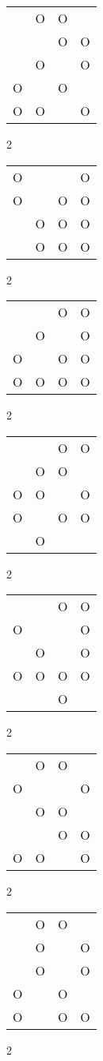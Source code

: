 \begin{tabular}{|m{0.2cm}m{0.2cm}m{0.2cm}m{0.2cm}|}\hline
 &O&O& \\
 & &O&O\\
 &O& &O\\
O& &O& \\
O&O& &O\\
\hline\end{tabular}2
\begin{tabular}{|m{0.2cm}m{0.2cm}m{0.2cm}m{0.2cm}|}\hline
O& & &O\\
O& &O&O\\
 &O&O&O\\
 &O&O&O\\
\hline\end{tabular}2
\begin{tabular}{|m{0.2cm}m{0.2cm}m{0.2cm}m{0.2cm}|}\hline
 & &O&O\\
 &O& &O\\
O& &O&O\\
O&O&O&O\\
\hline\end{tabular}2
\begin{tabular}{|m{0.2cm}m{0.2cm}m{0.2cm}m{0.2cm}|}\hline
 & &O&O\\
 &O&O& \\
O&O& &O\\
O& &O&O\\
 &O& & \\
\hline\end{tabular}2
\begin{tabular}{|m{0.2cm}m{0.2cm}m{0.2cm}m{0.2cm}|}\hline
 & &O&O\\
O& & &O\\
 &O& &O\\
O&O&O&O\\
 & &O& \\
\hline\end{tabular}2
\begin{tabular}{|m{0.2cm}m{0.2cm}m{0.2cm}m{0.2cm}|}\hline
 &O&O& \\
O& & &O\\
 &O&O& \\
 & &O&O\\
O&O& &O\\
\hline\end{tabular}2
\begin{tabular}{|m{0.2cm}m{0.2cm}m{0.2cm}m{0.2cm}|}\hline
 &O&O& \\
 &O& &O\\
 &O& &O\\
O& &O& \\
O& &O&O\\
\hline\end{tabular}2
